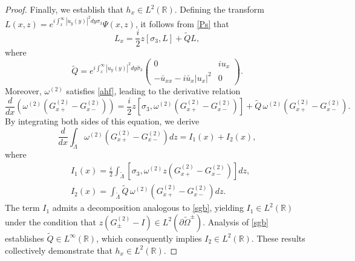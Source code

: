 \documentclass[10pt,a4paper]{amsart}
\begin{document}
\begin{proof}
Finally, we establish that $h_{x}\in L^{2}(\mathbb{R})$. Defining the transform $L(x,z)=e^{i\int_{x}^{\infty}|u_{y}(y)|^{2}dy\sigma_{3}}\Psi(x,z)$, it follows from \eqref{Ps} that
\begin{equation}\label{ahf}
L_{x}=\frac{i}{2}z\left[\sigma_{3},L\right]+\widetilde{Q}L,
\end{equation}
where
\begin{equation*}
\widetilde{Q}=e^{i\int_{x}^{\infty}|u_{y}(y)|^{2}dy\widehat{\sigma}_{3}}\begin{pmatrix}0&iu_{x}\\
-\bar{u}_{xx}-i\bar{u}_{x}|u_{x}|^{2}&0\end{pmatrix}.
\end{equation*}
Moreover, $\omega^{(2)}$ satisfies \eqref{ahf}, leading to the derivative relation
\begin{equation*}
\frac{d}{dx}\left(\omega^{(2)} \left(G^{(2)}_{x+}-G^{(2)}_{x-}\right)\right)=\frac{i}{2}z\left[\sigma_{3},\omega^{(2)} \left(G^{(2)}_{x+}-G^{(2)}_{x-}\right)\right]+\widetilde{Q}\,\omega^{(2)} \left(G^{(2)}_{x+}-G^{(2)}_{x-}\right).
\end{equation*}
By integrating both sides of this equation, we derive
\begin{equation}
\frac{d}{dx}\int_{\widetilde{\Lambda}}\omega^{(2)} \left(G^{(2)}_{x+}-G^{(2)}_{x-}\right)dz=I_{1}(x)+I_{2}(x),
\end{equation}
where
\begin{equation*}
\begin{aligned}
&I_{1}(x)=\frac{i}{2}\int_{\widetilde{\Lambda}}\left[\sigma_{3},\omega^{(2)} z\left(G^{(2)}_{x+}-G^{(2)}_{x-}\right)\right]dz,\\
&I_{2}(x)=\int_{\widetilde{\Lambda}}\widetilde{Q}\,\omega^{(2)} \left(G^{(2)}_{x+}-G^{(2)}_{x-}\right)dz.
\end{aligned}
\end{equation*}
The term $I_{1}$ admits a decomposition analogous to \eqref{sgb}, yielding $I_{1}\in L^{2}(\mathbb{R})$  under the condition that $z(G^{(2)}_{\pm}-I)\in L^{2}(\partial \widetilde{\Omega}^{\pm})$. Analysis of \eqref{sgb} establishes $\widetilde{Q}\in L^{\infty}(\mathbb{R})$, which consequently implies $I_{2}\in L^{2}(\mathbb{R})$. These results collectively demonstrate that $h_{x}\in L^{2}(\mathbb{R})$.
\end{proof}
\end{document}
